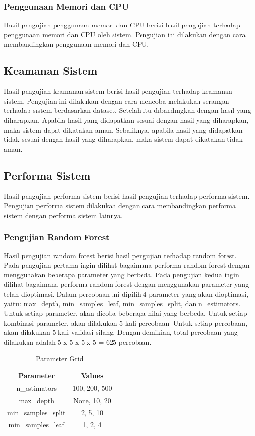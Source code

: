 \subsubsection{Penggunaan Memori dan CPU}
Hasil pengujian penggunaan memori dan CPU berisi hasil pengujian terhadap penggunaan memori dan CPU oleh sistem. Pengujian ini dilakukan dengan cara membandingkan penggunaan memori dan CPU.

\subsection{Keamanan Sistem}
Hasil pengujian keamanan sistem berisi hasil pengujian terhadap keamanan sistem. Pengujian ini dilakukan dengan cara mencoba melakukan serangan terhadap sistem berdasarkan dataset.
Setelah itu dibandingkan dengan hasil yang diharapkan. Apabila hasil yang didapatkan sesuai dengan hasil yang diharapkan, maka sistem dapat dikatakan aman. Sebaliknya, apabila hasil yang didapatkan tidak sesuai dengan hasil yang diharapkan, maka sistem dapat dikatakan tidak aman.


\subsection{Performa Sistem}
Hasil pengujian performa sistem berisi hasil pengujian terhadap performa sistem. Pengujian performa sistem dilakukan dengan cara membandingkan performa sistem dengan performa sistem lainnya.
\subsubsection{Pengujian Random Forest}
Hasil pengujian random forest berisi hasil pengujian terhadap random forest. Pada pengujian pertama ingin dilihat bagaimana performa random forest dengan menggunakan beberapa parameter yang berbeda. Pada pengujian kedua ingin dilihat bagaimana performa random forest dengan menggunakan parameter yang telah dioptimasi.
Dalam percobaan ini dipilih 4 parameter yang akan dioptimasi, yaitu: max\_depth, min\_samples\_leaf, min\_samples\_split, dan n\_estimators. Untuk setiap parameter, akan dicoba beberapa nilai yang berbeda. Untuk setiap kombinasi parameter, akan dilakukan 5 kali percobaan. Untuk setiap percobaan, akan dilakukan 5 kali validasi silang. Dengan demikian, total percobaan yang dilakukan adalah 5 x 5 x 5 x 5 = 625 percobaan.

\begin{table}[h]
    \centering
    \begin{tabular}{|c|c|}
    \hline
    \textbf{Parameter} & \textbf{Values} \\
    \hline
    n\_estimators & 100, 200, 500 \\
    \hline
    max\_depth & None, 10, 20 \\
    \hline
    min\_samples\_split & 2, 5, 10 \\
    \hline
    min\_samples\_leaf & 1, 2, 4 \\
    \hline
    \end{tabular}
    \caption{Parameter Grid}
    \label{table:2}
    \end{table}

